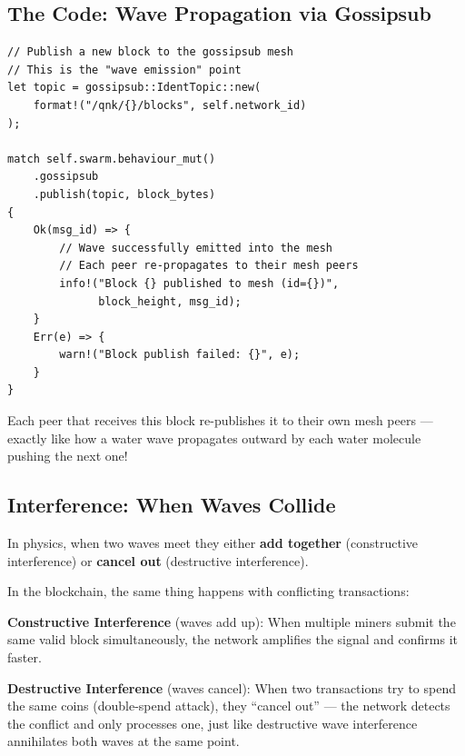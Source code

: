 \documentclass[11pt,a4paper]{article}
\begin{document}
\subsection{The Code: Wave Propagation via Gossipsub}

\begin{lstlisting}[caption={Gossipsub block propagation in unified\_network\_manager.rs --- spreading blocks like waves}]
// Publish a new block to the gossipsub mesh
// This is the "wave emission" point
let topic = gossipsub::IdentTopic::new(
    format!("/qnk/{}/blocks", self.network_id)
);

match self.swarm.behaviour_mut()
    .gossipsub
    .publish(topic, block_bytes)
{
    Ok(msg_id) => {
        // Wave successfully emitted into the mesh
        // Each peer re-propagates to their mesh peers
        info!("Block {} published to mesh (id={})",
              block_height, msg_id);
    }
    Err(e) => {
        warn!("Block publish failed: {}", e);
    }
}
\end{lstlisting}

Each peer that receives this block re-publishes it to their own mesh peers --- exactly like how a water wave propagates outward by each water molecule pushing the next one!

\subsection{Interference: When Waves Collide}

In physics, when two waves meet they either \textbf{add together} (constructive interference) or \textbf{cancel out} (destructive interference).

In the blockchain, the same thing happens with conflicting transactions:

\begin{tcolorbox}[colback=coolblue!10,colframe=coolblue,title=\textbf{Blockchain Wave Interference}]
\textbf{Constructive Interference} (waves add up): When multiple miners submit the same valid block simultaneously, the network amplifies the signal and confirms it faster.

\textbf{Destructive Interference} (waves cancel): When two transactions try to spend the same coins (double-spend attack), they ``cancel out'' --- the network detects the conflict and only processes one, just like destructive wave interference annihilates both waves at the same point.
\end{tcolorbox}
\end{document}
